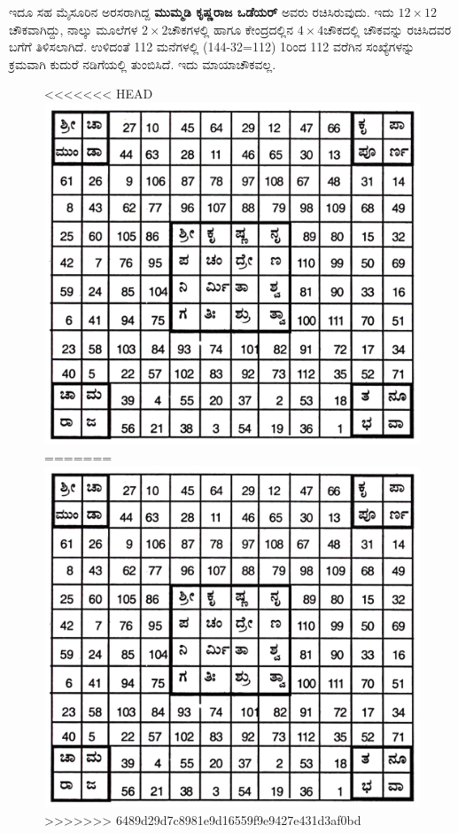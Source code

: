 ಇದೂ ಸಹ ಮೈಸೂರಿನ ಅರಸರಾಗಿದ್ದ \textbf{ಮುಮ್ಮಡಿ ಕೃಷ್ಣರಾಜ ಒಡೆಯರ್} ಅವರು ರಚಿಸಿ\-ರುವುದು. ಇದು $12 \times 12$ಚೌಕವಾಗಿದ್ದು, ನಾಲ್ಕು ಮೂಲೆಗಳ $2 \times 2$ಚೌಕಗಳಲ್ಲಿ ಹಾಗೂ ಕೇಂದ್ರದಲ್ಲಿನ $4 \times 4$ಚೌಕದಲ್ಲಿ ಚೌಕವನ್ನು ರಚಿಸಿದವರ ಬಗೆಗೆ ತಿಳಿಸಲಾಗಿದೆ. ಉಳಿದಂತೆ 112 ಮನೆಗಳಲ್ಲಿ (144-32=112) 1ರಿಂದ 112 ವರೆಗಿನ ಸಂಖ್ಯೆಗಳನ್ನು ಕ್ರಮವಾಗಿ ಕುದುರೆ ನಡಿಗೆಯಲ್ಲಿ ತುಂಬಿಸಿದೆ. ಇದು ಮಾಯಾಚೌಕವಲ್ಲ.
\begin{figure}[H]
<<<<<<< HEAD
\includegraphics{src/figures/chap6/fig6-11.jpg}
=======
\includegraphics[scale=0.8]{src/figures/chap6/fig6.11.jpg}
>>>>>>> 6489d29d7c8981e9d16559f9e9427e431d3af0bd
\end{figure}

